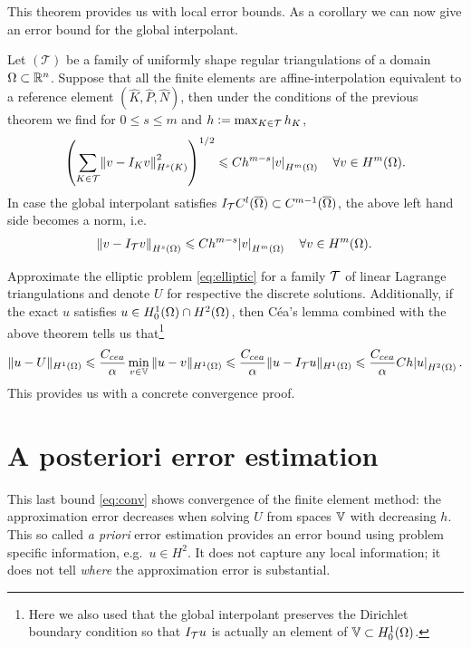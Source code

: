 \documentclass[thesis.tex]{subfiles}
\begin{document}
  This theorem provides us with local error bounds. As a corollary we can now
  give an error bound for the global interpolant.
  \begin{thm}
    \label{thm:apriorio}
    Let $(\mathcal{T})$ be a family of uniformly shape regular triangulations of a domain~$\Omega \subset \mathbb{R}^n$.
    Suppose that all the finite elements are affine-interpolation equivalent to a reference element $(\hat K, \hat P, \hat N)$,
    then under the conditions of the previous theorem we find for $0 \leq s \leq m$ and $h  := \max_{ K \in \mathcal{T}} h_K$,
    \[
      \left( \sum_{K \in \mathcal{T}} \norm{v - I_K v}^2_{H^s(K)}\right)^{1/2} \leqslant C h^{m-s} \abs{v}_{H^m(\Omega)} \quad \forall v \in H^m(\Omega).
    \]
    In case the global interpolant satisfies $I_{\mathcal{T}} C^l(\overline{\Omega}) \subset C^{m-1}(\overline{\Omega})$, the above left hand side becomes a norm, i.e.~
    \[
      \norm{v - I_{\mathcal{T}}v}_{H^s(\Omega)} \leqslant C h^{m-s} \abs{v}_{H^m(\Omega)} \quad \forall v \in H^m(\Omega).
    \]
  \end{thm}
  Approximate the elliptic problem \eqref{eq:elliptic}  for a family $\mathcal{T}$ of linear Lagrange triangulations and denote $U$
  for respective the discrete solutions.
  Additionally, if the exact $u$ satisfies $u \in H_0^1(\Omega)\cap H^2(\Omega)$, then C\'ea's lemma combined with the above theorem tells us that\footnote{
  Here we also used that the global interpolant preserves the Dirichlet boundary condition so that
   $I_{\mathcal{T}} u$ is actually an element of $\mathbb{V} \subset H_0^1(\Omega)$.}
  \begin{equation}
    \label{eq:conv}
    \|u - U\|_{H^1(\Omega)} \leqslant \frac{C_{cea}}{\alpha} \min_{v \in \mathbb{V}} \| u - v\|_{H^1(\Omega)} \leqslant \frac{C_{cea}}{\alpha} \| u - I_{\mathcal{T}}u \|_{H^1(\Omega)} \leqslant \frac{C_{cea}}{\alpha} C  h \abs{u}_{H^2(\Omega)}.
  \end{equation}
  This provides us with a concrete convergence proof.

  \section{A posteriori error estimation}
  \label{sec:afem}
  This last bound \eqref{eq:conv} shows convergence of the finite element method: the approximation error decreases when solving $U$ from spaces $\mathbb{V}$ with 
  decreasing $h$. 
  This so called \emph{a priori} error estimation provides an error bound
  using problem specific information, e.g.~$u \in H^2$. It does not capture
  any local information; it does not tell \emph{where} the approximation error is substantial. 
  
\end{document}
